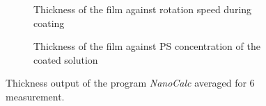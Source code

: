\begin{figure}[h]
    \centering
    \begin{subfigure}[b]{\textwidth}
        \centering
        
        \caption{Thickness of the film against rotation speed during coating}
        \label{fig:VglMethConcThick}
    \end{subfigure}

    \vspace{1cm}
    \begin{subfigure}[b]{\textwidth}
        \centering
           
        \caption{Thickness of the film against PS concentration of the coated solution} 
        \label{fig:VglMethRotThick}
    \end{subfigure}

    \caption{Thickness output of the program \textit{NanoCalc} averaged for 6 measurement.}
    \label{fig:thickconcrpm}
\end{figure}
